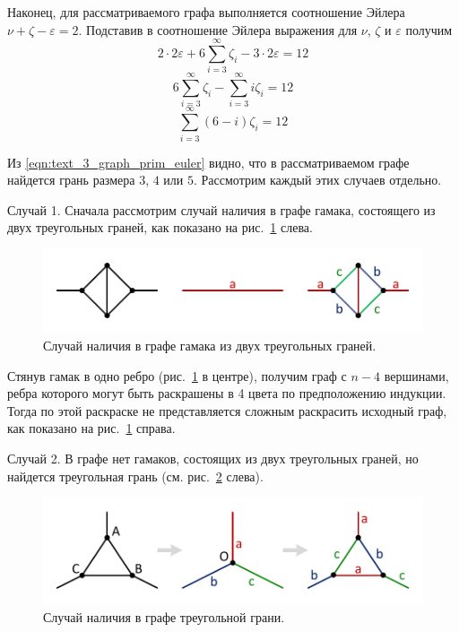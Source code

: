 Наконец, для рассматриваемого графа выполняется соотношение Эйлера $\nu + \zeta - \varepsilon = 2$.
Подставив в соотношение Эйлера выражения для $\nu$, $\zeta$ и $\varepsilon$ получим
\begin{equation}
	2 \cdot 2\varepsilon + 6 \sum_{i = 3}^{\infty}{\zeta_i} - 3 \cdot 2\varepsilon = 12
\end{equation}
\begin{equation}
	6 \sum_{i = 3}^{\infty}{\zeta_i} - \sum_{i = 3}^{\infty}{i \zeta_i} = 12
\end{equation}
\begin{equation}\label{eqn:text_3_graph_prim_euler}
	\sum_{i = 3}^{\infty}{(6 - i) \zeta_i} = 12
\end{equation}

Из \eqref{eqn:text_3_graph_prim_euler} видно, что в рассматриваемом графе найдется грань размера $3$, $4$ или $5$.
Рассмотрим каждый этих случаев отдельно.

Случай 1. Сначала рассмотрим случай наличия в графе гамака, состоящего из двух треугольных граней, как показано на рис.~\ref{fig:text_3_graph_prim_coloring4_gamak} слева.

\begin{figure}[ht]
\centering
\includegraphics[width=1.0\textwidth]{fig/par_coloring4_gamak.pdf}
\singlespacing
{}\caption{Случай наличия в графе гамака из двух треугольных граней.}
\label{fig:text_3_graph_prim_coloring4_gamak}
\end{figure}

Стянув гамак в одно ребро (рис.~\ref{fig:text_3_graph_prim_coloring4_gamak} в центре), получим граф с $n - 4$ вершинами, ребра которого могут быть раскрашены в 4 цвета по предположению индукции.
Тогда по этой раскраске не представляется сложным раскрасить исходный граф, как показано на рис.~\ref{fig:text_3_graph_prim_coloring4_gamak} справа.

Случай 2. В графе нет гамаков, состоящих из двух треугольных граней, но найдется треугольная грань (см. рис.~\ref{fig:text_3_graph_prim_coloring4_face3} слева).

\begin{figure}[ht]
\centering
\includegraphics[width=1.0\textwidth]{fig/par_coloring4_face3.pdf}
\singlespacing
{}\caption{Случай наличия в графе треугольной грани.}
\label{fig:text_3_graph_prim_coloring4_face3}
\end{figure}

